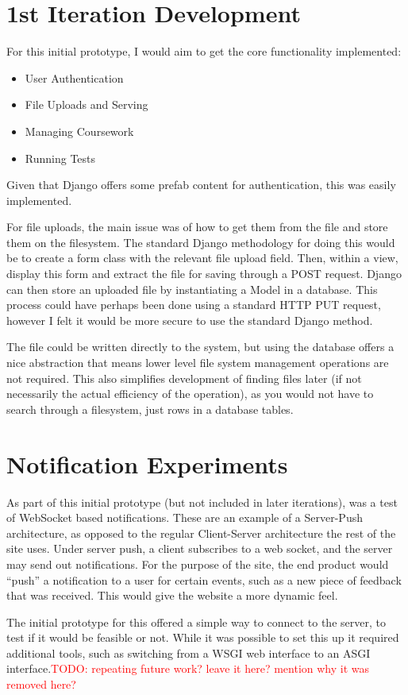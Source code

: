 \documentclass[a4paper,11pt]{report}
\newcommand{\todo}[1]{\textcolor{red}{TODO: #1}}
\begin{document}
\section{1st Iteration Development}
For this initial prototype, I would aim to get the core functionality implemented:
\begin{itemize}
\item User Authentication
\item File Uploads and Serving
\item Managing Coursework
\item Running Tests
\end{itemize}
Given that Django offers some prefab content for authentication, this was easily implemented.\par
For file uploads, the main issue was of how to get them from the file and store them on the filesystem. The standard Django methodology for doing this would be to create a form class with the relevant file upload field. Then, within a view, display this form and extract the file for saving through a POST request. Django can then store an uploaded file by instantiating a Model in a database. This process could have perhaps been done using a standard HTTP PUT request, however I felt it would be more secure to use the standard Django method.\par
The file could be written directly to the system, but using the database offers a nice abstraction that means lower level file system management operations are not required. This also simplifies development of finding files later (if not necessarily the actual efficiency of the operation), as you would not have to search through a filesystem, just rows in a database tables.\par

\section{Notification Experiments}
As part of this initial prototype (but not included in later iterations), was a test of WebSocket based notifications. These are an example of a Server-Push architecture, as opposed to the regular Client-Server architecture the rest of the site uses. Under server push, a client subscribes to a web socket, and the server may send out notifications. For the purpose of the site, the end product would ``push'' a notification to a user for certain events, such as a new piece of feedback that was received. This would give the website a more dynamic feel.\par
The initial prototype for this offered a simple way to connect to the server, to test if it would be feasible or not. While it was possible to set this up it required additional tools, such as switching from a WSGI web interface to an ASGI interface.\todo{repeating future work? leave it here? mention why it was removed here?}
\end{document}
